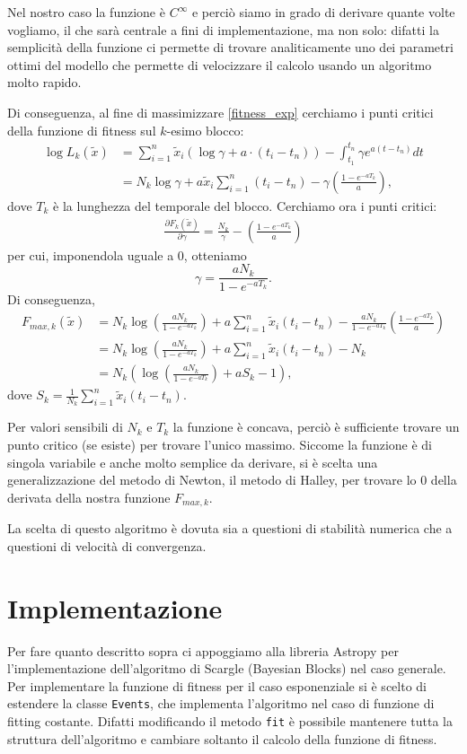 \documentclass[10pt,a4paper]{report}
\begin{document}
Nel nostro caso la funzione è $C^{\infty}$ e perciò siamo in grado di derivare quante volte vogliamo, il che sarà centrale a fini di implementazione, ma non solo: difatti la semplicità della funzione ci permette di trovare analiticamente uno dei parametri ottimi del modello che permette di velocizzare il calcolo usando un algoritmo molto rapido.

Di conseguenza, al fine di massimizzare \eqref{fitness_exp} cerchiamo i punti critici della funzione di fitness sul $k$-esimo blocco:
\begin{align*}
\log L_k(\tilde{x}) &= \sum_{i=1}^n\tilde{x}_i(\log\gamma + a\cdot(t_i-t_n)) -\int_{t_1}^{t_n}\gamma e^{a(t-t_n)} dt\\
&=N_k\log\gamma + a\tilde{x}_i\sum_{i=1}^n(t_i-t_n)-\gamma\left(\frac{1-e^{-aT_k}}{a}\right),
\end{align*}
dove $T_k$ è la lunghezza del temporale del blocco. Cerchiamo ora i punti critici:
\begin{align*}
\frac{\partial F_k(\tilde{x})}{\partial \gamma} = \frac{N_k}{\gamma} - \left(\frac{1-e^{-aT_k}}{a}\right)
\end{align*}
per cui, imponendola uguale a $0$, otteniamo 
$$
\gamma = \frac{aN_k}{1-e^{-aT_k}}.
$$
Di conseguenza,
\begin{align}\nonumber
F_{max,k}(\tilde{x}) &= N_k\log\left(\frac{aN_k}{1-e^{-aT_k}}\right) + a\sum_{i=1}^n\tilde{x}_i(t_i-t_n)-\frac{aN_k}{1-e^{-aT_k}}\left(\frac{1-e^{-aT_k}}{a}\right)\\ \nonumber
&= N_k\log\left(\frac{aN_k}{1-e^{-aT_k}}\right) + a\sum_{i=1}^n\tilde{x}_i(t_i-t_n)-N_k\\
&= N_k\left(\log\left(\frac{aN_k}{1-e^{-aT_k}}\right) + aS_k-1\right),\label{our_loglikel}
\end{align}
dove $S_k = \frac{1}{N_k}\sum_{i=1}^n\tilde{x}_i(t_i-t_n)$. 

Per valori sensibili di $N_k$ e $T_k$ la funzione è concava, perciò è sufficiente trovare un punto critico (se esiste) per trovare l'unico massimo. Siccome la funzione è di singola variabile e anche molto semplice da derivare, si è scelta una generalizzazione del metodo di Newton, il metodo di Halley, per trovare lo $0$ della derivata della nostra funzione $F_{max,k}$.

La scelta di questo algoritmo è dovuta sia a questioni di stabilità numerica che a questioni di velocità di convergenza.
\section{Implementazione}
Per fare quanto descritto sopra ci appoggiamo alla libreria Astropy per l'implementazione dell'algoritmo di Scargle (Bayesian Blocks) nel caso generale. Per implementare la funzione di fitness per il caso esponenziale si è scelto di estendere la classe \texttt{Events}, che implementa l'algoritmo nel caso di funzione di fitting costante. Difatti modificando il metodo \texttt{fit} è possibile mantenere tutta la struttura dell'algoritmo e cambiare soltanto il calcolo della funzione di fitness.
\end{document}
